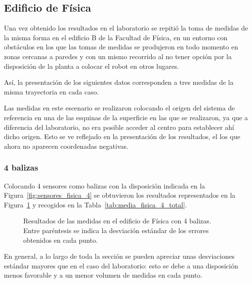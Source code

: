 \subsection{Edificio de Física}

Una vez obtenido los resultados en el laboratorio se repitió la toma de medidas de la misma forma en el edificio B de la Facultad de Física, en un entorno con obstáculos en los que las tomas de medidas se produjeron en todo momento en zonas cercanas a paredes y con un mismo recorrido al no tener opción por la disposición de la planta a colocar el robot en otros lugares.

Así, la presentación de los siguientes datos corresponden a tres medidas de la misma trayectoria en cada caso.

Las medidas en este escenario se realizaron colocando el origen del sistema de referencia en una de las esquinas de la superficie en las que se realizaron, ya que a diferencia del laboratorio, no era posible acceder al centro para establecer ahí dicho origen.
Esto se ve reflejado en la presentación de los resultados, el los que ahora no aparecen coordenadas negativas.

\subsubsection{4 balizas}

Colocando 4 sensores como balizas con la disposición indicada en la Figura~\ref{fig:sensores_fisica_4} se obtuvieron los resultados representados en la Figura~\ref{fig:res_fisica_4} y recogidos en la Tabla~\ref{tab:media_fisica_4_total}.
\begin{figure}[H]
    \centering
    
    \caption{Resultados de las medidas en el edificio de Física con 4 balizas. \newline Entre paréntesis se indica la desviación estándar de los errores obtenidos en cada punto.}
    \label{fig:res_fisica_4}
\end{figure}

En general, a lo largo de toda la sección se pueden apreciar unas desviaciones estándar mayores que en el caso del laboratorio: esto se debe a una disposición menos favorable y a un menor volumen de medidas en cada punto.

